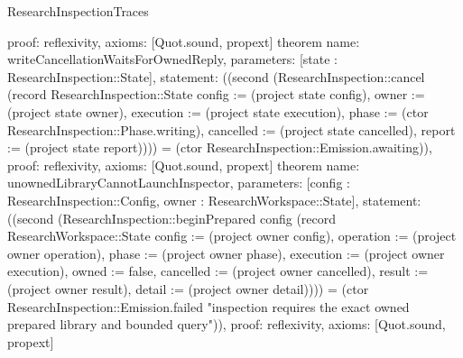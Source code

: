 \begin{lexlean}{ResearchInspectionTraces}
\begin{semanticmodule}
{ proof: reflexivity{},
 axioms: [Quot.sound, propext]
}
theorem{
 name: writeCancellationWaitsForOwnedReply,
 parameters: [state : ResearchInspection::State],
 statement: ((second (ResearchInspection::cancel (record ResearchInspection::State {config := (project state config), owner := (project state owner), execution := (project state execution), phase := (ctor ResearchInspection::Phase.writing), cancelled := (project state cancelled), report := (project state report)}))) = (ctor ResearchInspection::Emission.awaiting)),
 proof: reflexivity{},
 axioms: [Quot.sound, propext]
}
theorem{
 name: unownedLibraryCannotLaunchInspector,
 parameters: [config : ResearchInspection::Config, owner : ResearchWorkspace::State],
 statement: ((second (ResearchInspection::beginPrepared config (record ResearchWorkspace::State {config := (project owner config), operation := (project owner operation), phase := (project owner phase), execution := (project owner execution), owned := false, cancelled := (project owner cancelled), result := (project owner result), detail := (project owner detail)}))) = (ctor ResearchInspection::Emission.failed "inspection requires the exact owned prepared library and bounded query")),
 proof: reflexivity{},
 axioms: [Quot.sound, propext]
}
\end{semanticmodule}
\end{lexlean}
